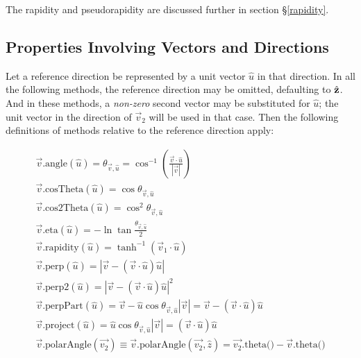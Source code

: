 The rapidity and pseudorapidity are discussed further in
section \S{\ref{rapidity}}.

\subsection{Properties Involving Vectors and Directions}

Let a reference direction be represented by a unit vector $\hat{u}$ in that
direction.
In all the following methods, the reference direction may be
omitted, defaulting to $\hat{\bf z}$.
And in these methods, a {\em non-zero} second vector may be
substituted for $\hat{u}$; the unit vector in the direction of $\vec{v}_2$
will be used in that case.
Then the following definitions of methods relative to the reference direction
apply:

\begin{eqnarray}
  \vec{v}\mbox{.angle} (\hat{u}) =
    \theta_{\vec{v},\hat{u}} =
    \cos^{-1} \left( \frac{ \vec{v} \cdot \hat{u} }
    { \left| \vec{v} \right| } \right)
    \label{eq:angle} \label{eq:theta} \\
  \vec{v}\mbox{.cosTheta} (\hat{u}) =
    \cos \theta_{\vec{v},\hat{u}}
    \label{eq:cosTheta} \\
  \vec{v}\mbox{.cos2Theta} (\hat{u}) =
    \cos^2 \theta_{\vec{v},\hat{u}}
    \label{eq:cos2Theta} \\
  \vec{v}\mbox{.eta} (\hat{u}) =
    -\ln \tan \frac {\theta_{\vec{v},\hat{u}}}{2}
    \label{eq:eta:2} \\
  \vec{v}\mbox{.rapidity} (\hat{u}) =
    \tanh^{-1} (\vec{v}_{1} \cdot \hat{u})
    \label{eq:rap:2} \\
  \vec{v}\mbox{.perp} (\hat{u}) =
    \left| \vec{v} - (\vec{v} \cdot \hat{u}) \hat{u} \right|
    \label{eq:perp} \\
  \vec{v}\mbox{.perp2} (\hat{u}) =
    \left| \vec{v} - (\vec{v} \cdot \hat{u}) \hat{u} \right| ^2
    \label{eq:perp2} \\
  \vec{v}\mbox{.perpPart} (\hat{u}) =
    \vec{v} -
    \hat{u} \cos \theta_{\vec{v},\hat{u}}
    \left| \vec{v} \right| =
    \vec{v} - (\vec{v} \cdot \hat{u}) \hat{u}
    \label{eq:perpPart} \\
  \vec{v}\mbox{.project} (\hat{u}) =
    \hat{u} \cos \theta_{\vec{v},\hat{u}}
    \left| \vec{v} \right| =
    (\vec{v} \cdot \hat{u}) \hat{u}
    \label{eq:project} \\
  \vec{v}\mbox{.polarAngle} (\vec{v_2})
    \equiv \vec{v}\mbox{.polarAngle} (\vec{v_2}, \hat{z}) =
    \vec{v_2}\mbox{.theta()} - \vec{v}\mbox{.theta()}

\end{eqnarray}
